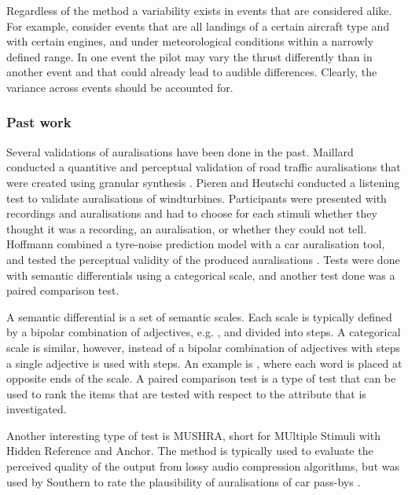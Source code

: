Regardless of the method a variability exists in events that are considered
alike. For example, consider events that are all landings of a certain aircraft
type and with certain engines, and under meteorological conditions within a narrowly
defined range. In one event the pilot may vary the thrust differently than in
another event and that could already lead to audible differences.
Clearly, the variance across events should be accounted for.

\subsubsection*{Past work}
Several validations of auralisations have been done in the past. Maillard
conducted a quantitive and perceptual validation of road traffic auralisations
that were created using granular synthesis \cite{Maillard2014}. Pieren and
Heutschi conducted a listening test to validate auralisations of
windturbines. Participants were presented with recordings and auralisations and
had to choose for each stimuli whether they thought it was a recording, an
auralisation, or whether they could not tell. Hoffmann combined a tyre-noise
prediction model with a car auralisation tool, and tested the perceptual
validity of the produced auralisations \cite{Hoffmann2016a,Hoffmann2016}. Tests
were done with semantic differentials using a categorical scale, and another
test done was a paired comparison test.

A semantic differential is a set of semantic scales. Each scale is typically
defined by a bipolar combination of adjectives, e.g. , and
divided into steps. A categorical scale is similar, however, instead of a
bipolar combination of adjectives with steps a single adjective is used with
steps. An example is , where each word is placed at opposite
ends of the scale. A paired comparison test is a type of test that can be used
to rank the items that are tested with respect to the attribute that is
investigated.

Another interesting type of test is MUSHRA, short for MUltiple Stimuli with
Hidden Reference and Anchor. The method is typically used to evaluate the
perceived quality of the output from lossy audio compression algorithms, but was
used by Southern to rate the plausibility of auralisations of car pass-bys
\cite{Southern2016}.

